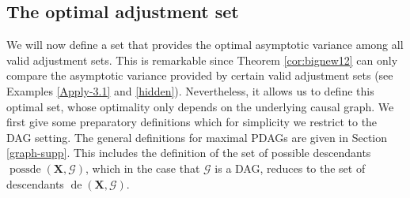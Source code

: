 \documentclass[11pt,a4paper]{article}
\newtheorem{Theorem}[Satz]{Theorem}
\theoremstyle{definition}
\theoremstyle{remark}
\DeclareMathOperator{\de}{de}
\DeclareMathOperator{\possde}{possde}
\newcommand{\mpdag}{maximal PDAG}
\newcommand{\g}[1][G]{\mathcal{#1}}
\newcommand{\optb}[2][X,Y]{\mathbf{O}(\mathbf{#1},#2)}
\begin{document}



%



\subsection{The optimal adjustment set} \label{sec:cpdag}

\label{sec:optimal-set}
We will now define a set that provides the optimal asymptotic variance among all valid adjustment sets. 
This is remarkable since Theorem \ref{cor:bignew12} can only compare the asymptotic variance provided by certain valid adjustment sets (see Examples \ref{Apply-3.1} and \ref{hidden}). Nevertheless, it allows us to define this optimal set, whose optimality only depends on the underlying causal graph. We first give some preparatory definitions which for simplicity we restrict to the DAG setting. The general definitions for \mpdag{}s are given in Section \ref{graph-supp}. This includes the definition of the set of possible descendants $\possde(\mathbf{X},\g)$, which in the case that $\g$ is a DAG, reduces to the set of descendants $\de(\mathbf{X},\g)$.
\end{document}
